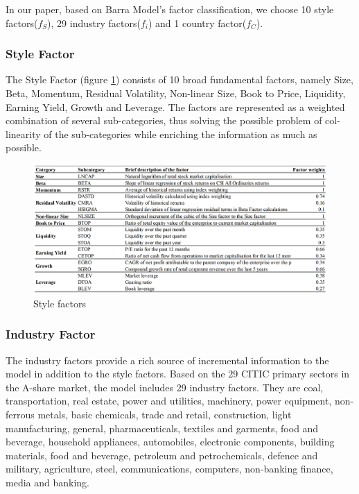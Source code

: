 \documentclass[10pt]{article}
\begin{document}
 In our paper, based on Barra Model's factor classification, we choose 10 style factors($f_S$), 29 industry factors($f_i$) and 1 country factor($f_C$). 
 
\subsubsection{Style Factor}
The Style Factor (figure \ref{fig:fs}) consists of 10 broad fundamental factors, namely Size, Beta, Momentum, Residual Volatility, Non-linear Size, Book to Price, Liquidity, Earning Yield, Growth and Leverage. The factors are represented as a weighted combination of several sub-categories, thus solving the possible problem of col-linearity of the sub-categories while enriching the information as much as possible.
\begin{figure}
    \centering
     \includegraphics[width=1\textwidth]{Style Factor.png}
    \caption{Style factors}
    \label{fig:fs}
\end{figure}

\subsubsection{Industry Factor}
The industry factors provide a rich source of incremental information to the model in addition to the style factors. Based on the 29 CITIC primary sectors in the A-share market, the model includes 29 industry factors. They are coal, transportation, real estate, power and utilities, machinery, power equipment, non-ferrous metals, basic chemicals, trade and retail, construction, light manufacturing, general, pharmaceuticals, textiles and garments, food and beverage, household appliances, automobiles, electronic components, building materials, food and beverage, petroleum and petrochemicals, defence and military, agriculture,  steel, communications, computers, non-banking finance, media and banking. 
\end{document}
